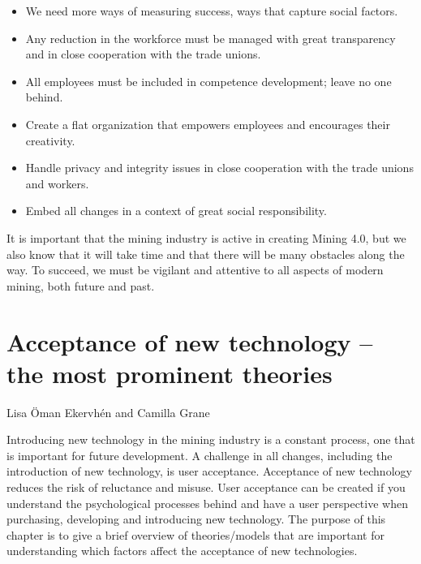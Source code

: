 \documentclass[
  12pt,
]{scrbook}
\newenvironment{chap-auth}
{\vspace{1cm}\begin{center}\begin{flushright}\sffamily\noindent}
  {\end{flushright}\end{center}\vspace{1cm}}
\begin{document}
\begin{itemize}
\item
  We need more ways of measuring success, ways that capture social factors.
\item
  Any reduction in the workforce must be managed with great transparency and in close cooperation with the trade unions.
\item
  All employees must be included in competence development; leave no one behind.
\item
  Create a flat organization that empowers employees and encourages their creativity.
\item
  Handle privacy and integrity issues in close cooperation with the trade unions and workers.
\item
  Embed all changes in a context of great social responsibility.
\end{itemize}

It is important that the mining industry is active in creating Mining 4.0, but we also know that it will take time and that there will be many obstacles along the way. To succeed, we must be vigilant and attentive to all aspects of modern mining, both future and past.

\hypertarget{acceptance-of-new-technology-the-most-prominent-theories}{%
\chapter{Acceptance of new technology -- the most prominent theories}\label{acceptance-of-new-technology-the-most-prominent-theories}}

\begin{chap-auth}
Lisa Öman Ekervhén and Camilla Grane
\end{chap-auth}

Introducing new technology in the mining industry is a constant process, one that is important for future development. A challenge in all changes, including the introduction of new technology, is user acceptance. Acceptance of new technology reduces the risk of reluctance and misuse. User acceptance can be created if you understand the psychological processes behind and have a user perspective when purchasing, developing and introducing new technology. The purpose of this chapter is to give a brief overview of theories/models that are important for understanding which factors affect the acceptance of new technologies.
\end{document}
